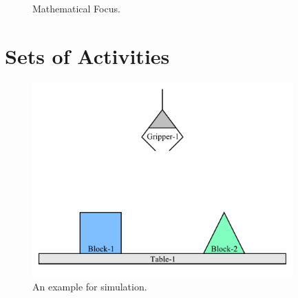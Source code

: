 \begin{figure}[bth]
{

}

\caption{Mathematical Focus.}
\label{figure:mathematical_simulation}
\end{figure}


\section{Sets of Activities}

\begin{figure}[bth]
\includegraphics[width=10cm]{gfx/blocks_world_simulation}
\caption{An example for simulation.}
\label{figure:blocks_world_simulation}
\end{figure}


